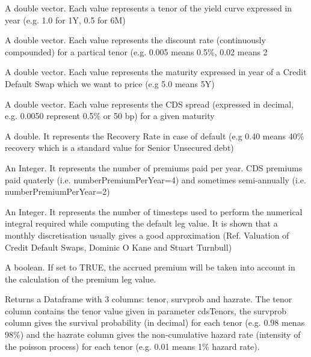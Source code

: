 \documentclass[a4paper]{book}
\begin{document}
\begin{Arguments}
\begin{ldescription}
\item[\code{yieldcurveTenor}] 
A double vector. Each value represents a tenor of the yield curve expressed in year (e.g. 1.0 for 1Y, 0.5 for 6M)

\item[\code{yieldcurveRate}] 
A double vector. Each value represents the discount rate (continuously compounded) for a partical tenor (e.g. 0.005 means 0.5\%, 0.02 means 2

\item[\code{cdsTenors}] 
A double vector. Each value represents the maturity expressed in year of a Credit Default Swap which we want to price (e.g 5.0 means 5Y)

\item[\code{cdsSpreads}] 
A double vector. Each value represents the CDS spread (expressed in decimal, e.g. 0.0050 represent 0.5\% or 50 bp) for a given maturity

\item[\code{recoveryRate}] 
A double. It represents the Recovery Rate in case of default (e.g 0.40 means 40\% recovery which is a standard value for Senior Unsecured debt)

\item[\code{numberPremiumPerYear}] 
An Integer. It represents the number of premiums paid per year. CDS premiums paid quaterly (i.e. numberPremiumPerYear=4) and sometimes semi-annually (i.e. numberPremiumPerYear=2)
	
\item[\code{numberDefaultIntervalPerYear}] 
An Integer. It represents the number of timesteps used to perform the numerical integral required while computing the default leg value. It is shown that a monthly discretisation usually gives a good approximation (Ref. Valuation of Credit Default Swaps, Dominic O Kane and Stuart Turnbull)
	
\item[\code{accruedPremium}] 
A boolean. If set to TRUE, the accrued premium will be taken into account in the calculation of the premium leg value.
	
\end{ldescription}
\end{Arguments}
%
\begin{Value}
Returns a Dataframe with 3 columns: tenor, survprob and hazrate. The tenor column contains the tenor value given in parameter cdsTenors, the survprob column gives the survival probability (in decimal) for each tenor (e.g. 0.98 menas 98\%) and the hazrate column gives the non-cumulative hazard rate (intensity of the poisson process) for each tenor (e.g. 0.01 means 1\% hazard rate).
\end{Value}
\end{document}
